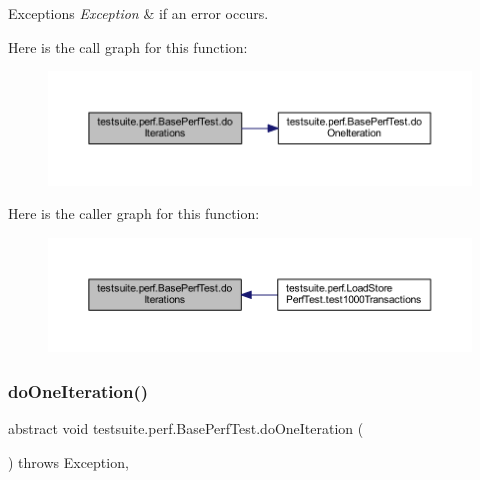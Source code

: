 \begin{DoxyExceptions}{Exceptions}
{\em Exception} & if an error occurs. \\
\hline
\end{DoxyExceptions}
Here is the call graph for this function\+:
\nopagebreak
\begin{figure}[H]
\begin{center}
\leavevmode
\includegraphics[width=350pt]{classtestsuite_1_1perf_1_1_base_perf_test_a5d1d0a1bf44d9feb9603a2c98705c6c6_cgraph}
\end{center}
\end{figure}
Here is the caller graph for this function\+:
\nopagebreak
\begin{figure}[H]
\begin{center}
\leavevmode
\includegraphics[width=350pt]{classtestsuite_1_1perf_1_1_base_perf_test_a5d1d0a1bf44d9feb9603a2c98705c6c6_icgraph}
\end{center}
\end{figure}
\mbox{\label{classtestsuite_1_1perf_1_1_base_perf_test_ac9682520790f17d153ad993c7bdf5bf4}} 
\subsubsection{\texorpdfstring{do\+One\+Iteration()}{doOneIteration()}}
{\footnotesize\ttfamily abstract void testsuite.\+perf.\+Base\+Perf\+Test.\+do\+One\+Iteration (\begin{DoxyParamCaption}{ }\end{DoxyParamCaption}) throws Exception\hspace{0.3cm}{\ttfamily [abstract]}, {\ttfamily [protected]}}

